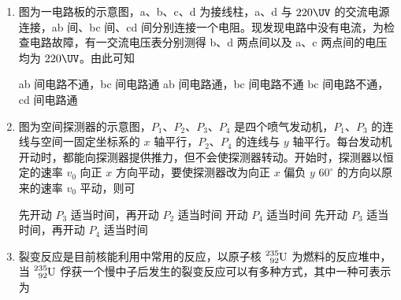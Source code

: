 \documentclass[\gkver]{gaokaozhenti}
\begin{document}
\begin{enumerate}
\item
图为一电路板的示意图，a、b、c、d 为接线柱，a、d 与 $220\UV$ 的交流电源连接，ab 间、bc 间、cd 间分别连接一个电阻。现发现电路中没有电流，为检查电路故障，有一交流电压表分别测得 b、d 两点间以及 a、c 两点间的电压均为 $220\UV$。由此可知 

{ab 间电路不通，bc 间电路通}
{ab 间电路通，bc 间电路不通}
{bc 间电路不通，cd 间电路通}


\item
图为空间探测器的示意图，$P_{1}$、$P_{2}$、$P_{3}$、$P_{4}$ 是四个喷气发动机，$P_{1}$、$P_{3}$ 的连线与空间一固定坐标系的 $x$ 轴平行，$P_{2}$、$P_{4}$ 的连线与 $y$ 轴平行。每台发动机开动时，都能向探测器提供推力，但不会使探测器转动。开始时，探测器以恒定的速率 $v_{0}$ 向正 $x$ 方向平动，要使探测器改为向正 $x$ 偏负 $y$ $60^\circ$ 的方向以原来的速率 $v_{0}$ 平动，则可 

{先开动 $P_{3}$ 适当时间，再开动 $P_{2}$ 适当时间}
{开动 $P_{4}$ 适当时间}
{先开动 $P_{3}$ 适当时间，再开动 $P_{4}$ 适当时间}


\item
裂变反应是目前核能利用中常用的反应，以原子核 $\ce{^{235}_{92}U}$ 为燃料的反应堆中，当 $\ce{^{235}_{92}U}$ 俘获一个慢中子后发生的裂变反应可以有多种方式，其中一种可表示为


\end{enumerate}
\end{document}
